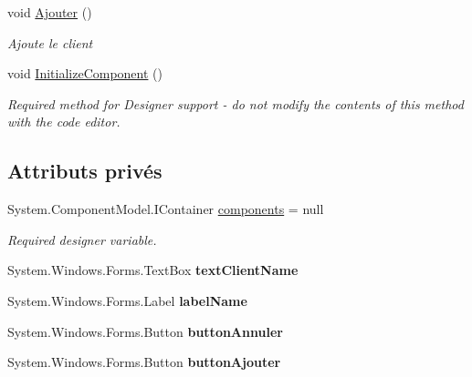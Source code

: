 \begin{DoxyCompactItemize}
void \mbox{\hyperlink{class_m_t_connect_agent_1_1_form_ajout_client_a577a05b6d1bffbb16d75e961d5624a0a}{Ajouter}} ()
\begin{DoxyCompactList}\small\item\em Ajoute le client \end{DoxyCompactList}\item 
void \mbox{\hyperlink{class_m_t_connect_agent_1_1_form_ajout_client_ac1e2bea6992dcf441bfddec9445a56d5}{Initialize\+Component}} ()
\begin{DoxyCompactList}\small\item\em Required method for Designer support -\/ do not modify the contents of this method with the code editor. \end{DoxyCompactList}\end{DoxyCompactItemize}
\subsection*{Attributs privés}
\begin{DoxyCompactItemize}
\item 
System.\+Component\+Model.\+I\+Container \mbox{\hyperlink{class_m_t_connect_agent_1_1_form_ajout_client_aaa9221b352c79976eee17048d4a786db}{components}} = null
\begin{DoxyCompactList}\small\item\em Required designer variable. \end{DoxyCompactList}\item 
\mbox{\label{class_m_t_connect_agent_1_1_form_ajout_client_a2cf281bb548894189816027cfa340465}} 
System.\+Windows.\+Forms.\+Text\+Box {\bfseries text\+Client\+Name}
\item 
\mbox{\label{class_m_t_connect_agent_1_1_form_ajout_client_af4bf6c8ff0e1b15b816788d941831a47}} 
System.\+Windows.\+Forms.\+Label {\bfseries label\+Name}
\item 
\mbox{\label{class_m_t_connect_agent_1_1_form_ajout_client_a397961d7360c72e0e3565bf286cb7b9e}} 
System.\+Windows.\+Forms.\+Button {\bfseries button\+Annuler}
\item 
\mbox{\label{class_m_t_connect_agent_1_1_form_ajout_client_a8de60d6a1ba7c6b10ba7cf6d60c9f6da}} 
System.\+Windows.\+Forms.\+Button {\bfseries button\+Ajouter}
\end{DoxyCompactItemize}


